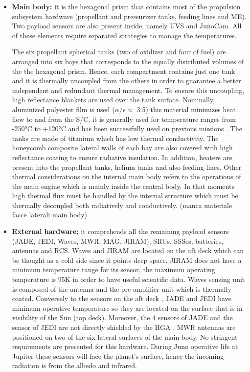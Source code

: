 \begin{itemize}
    \item \textbf{Main body:} it is the hexagonal prism that contains most of the propulsion subsystem hardware (propellant and pressurizer tanks, feeding lines and ME). Two payload sensors are also present inside, namely UVS and JunoCam. All of these elements require separated strategies to manage the temperatures. 
    
    The six propellant spherical tanks (two of oxidizer and four of fuel) are arranged into six bays that corresponds to the equally distributed volumes of the the hexagonal prism. Hence, each compartment contains just one tank and it is thermally uncoupled from the others in order to guarantee a better independent and redundant thermal management. To ensure this uncoupling, high reflectance blankets are used over the tank surface. Nominally, aluminized polyester film is used ($\alpha / \epsilon \approx$ 3.5) this material minimizes heat flow to and from the S/C, it is generally used for temperature ranges from -250°C to +120°C and has been successfully used on previous missions \cite{alum_poly}. The tanks are made of titanium which has low thermal conductivity. 
    The honeycomb composite lateral walls of each bay are also covered with high reflectance coating to ensure radiative insulation.
    In addition, heaters are present into the propellant tanks, helium tanks and also feeding lines. \cite{LL_early_cruise}
    Other thermal considerations on the internal main body refers to the  operations of the main engine which is mainly inside the central body. In that moments high thermal flux must be handled by the internal structure which must be thermally decoupled both radiatively and conductively. (manca materiale facce laterali main body)
    \item \textbf{External hardware:} it comprehends all the remaining payload sensors (JADE, JEDI, Waves, MWR, MAG, JIRAM), SRUs, SSSes, batteries, antennas and RCS. Waves and JIRAM are located on the aft deck which can be thought as a cold side since it points deep space. JIRAM does not have a minimum temperature range for its sensor, the maximum operating temperature is 95K in order to have useful scientific data.\cite{JIRAM_info} Waves sensing unit is composed of the antenna and the pre-amplifier unit which is thermally coated. Conversely to the sensors on the aft deck \cite{Waves_info}, JADE and JEDI have minimum operative temperature so they are located on the surface that is in visibility of the Sun (top deck). Moreover, the 4 sensors of JADE and the sensor of JEDI are not directly shielded by the HGA \cite{JADE_info}.\cite{JEDI_info} MWR antennas are positioned on two of the six lateral surfaces of the main body. \cite{MWR_info} No stringent requirements are presented for this hardware. During Juno operative life at Jupiter these sensors will face the planet's surface, hence the incoming radiation is from the albedo and infrared. 

\end{itemize}

